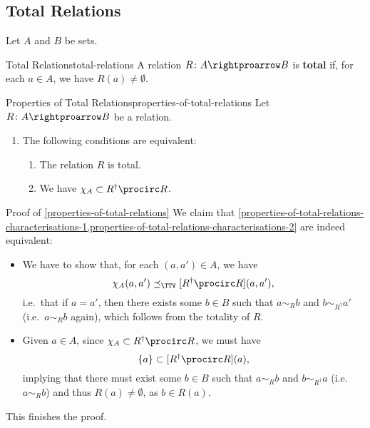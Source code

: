 \subsection{Total Relations}\label{subsection-total-relations}
Let $A$ and $B$ be sets.
\begin{definition}{Total Relations}{total-relations}%
    A relation $R\colon A\rightproarrow B$ is \textbf{total} if, for each $a\in A$, we have $R(a)\neq\emptyset$.
\end{definition}
\begin{proposition}{Properties of Total Relations}{properties-of-total-relations}%
    Let $R\colon A\rightproarrow B$ be a relation.
    \begin{enumerate}
        \item\label{properties-of-total-relations-characterisations}The following conditions are equivalent:
            \begin{enumerate}
                \item\label{properties-of-total-relations-characterisations-1}The relation $R$ is total.
                \item\label{properties-of-total-relations-characterisations-2}We have $\chi_{A}\subset R^{\dagger}\procirc R$.
            \end{enumerate}
    \end{enumerate}
\end{proposition}
\begin{Proof}{Proof of \cref{properties-of-total-relations}}%
    We claim that \cref{properties-of-total-relations-characterisations-1,properties-of-total-relations-characterisations-2} are indeed equivalent:
    \begin{itemize}
        \item{}We have to show that, for each $(a,a')\in A$, we have
            \[
                \chi_{A}(a,a')%
                \preceq_{\TTV}%
                [R^{\dagger}\procirc R](a,a'),%
            \]%
            i.e.\ that if $a=a'$, then there exists some $b\in B$ such that $a\sim_{R}b$ and $b\sim_{R^{\dagger}}a'$ (i.e.\ $a\sim_{R}b$ again), which follows from the totality of $R$.
        \item{}Given $a\in A$, since $\chi_{A}\subset R^{\dagger}\procirc R$, we must have
            \[
                \{a\}%
                \subset%
                [R^{\dagger}\procirc R](a),%
            \]%
            implying that there must exist some $b\in B$ such that $a\sim_{R}b$ and $b\sim_{R^{\dagger}}a$ (i.e.\ $a\sim_{R}b$) and thus $R(a)\neq\emptyset$, as $b\in R(a)$.
    \end{itemize}
    This finishes the proof.
\end{Proof}
